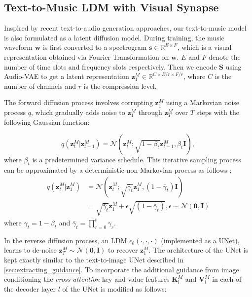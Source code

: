 \subsection{Text-to-Music LDM with Visual Synapse}\label{sec:visual_synapse}
Inspired by recent text-to-audio \cite{audioldm,tango} generation approaches, our text-to-music model is also formulated as a latent diffusion model. During training, the music waveform $\bm{w}$ is first converted to a spectrogram $\bm{s} \in 
\mathbb{R}^{E \times F}$, which is a visual representation obtained via Fourier Transformation on $\bm{w}$. $E$ and $F$ denote the number of time slots and frequency slots respectively. Then we encode $\bm{S}$ using Audio-VAE \cite{audioldm} to get a latent representation $\bm{z}_1^M \in \mathbb{R}^{C \times E/r \times F/r}$, where $C$ is the number of channels and $r$ is the compression level.

The forward diffusion process involves corrupting $\bm{z}_1^M$ using a Markovian noise process $q$, which gradually adds noise to $\bm{z}_1^M$ through $\bm{z}_T^M$ over $T$ steps with the following Gaussian function:

\vspace{-0.11in}

\begin{equation}
    q(\bm{z}_{t}^M | \bm{z}_{t-1}^M) = \mathcal{N}(\bm{z}_t^M; \sqrt{1 - \beta_t}\bm{z}_{t-1}^M, \beta_t 
\textbf{I}),
\end{equation}
where $\beta_t$ is a predetermined variance schedule. This iterative sampling process can be approximated by a deterministic non-Markovian process as follows \cite{song2020denoising}:
\begin{align} 
q(\bm{z}_{t}^{M} | \bm{z}_{1}^{M}) &=  \mathcal{N}(\bm{z}_{t}^{M}; \sqrt{\bar{\gamma}_t}\bm{z}_{1}^{M}, (1 - \bar{\gamma}_t) \textbf{I}) \\ 
 &=  \sqrt{\bar{\gamma}_t}\bm{z}_{1}^{M} + \epsilon \sqrt{(1 - \bar{\gamma}_t)}, \epsilon \sim \mathcal{N}(\boldsymbol{0}, \textbf{I}) \label{eqn:noise}
\end{align}
where $\gamma_t = 1 - \beta_t$ and $\bar{\gamma}_t = \prod_{r=0}^t \gamma_r$.

In the reverse diffusion process, an LDM  $\epsilon_\theta(\cdot,\cdot,\cdot)$ (implemented as a UNet), learns to de-noise $\bm{z}_T^M \sim \mathcal{N}(\boldsymbol{0}, \textbf{I})$ to recover $\bm{z}_1^M$. The architecture of the UNet is kept exactly similar to the text-to-image UNet described in \cref{sec:extracting_guidance}. To incorporate the additional guidance from image conditioning the \textit{cross-attention} key and value features $\bm{K}_l^{M}$ and $\bm{V}_l^{M}$ in each of the decoder layer $l$ of the UNet is modified as follows:

